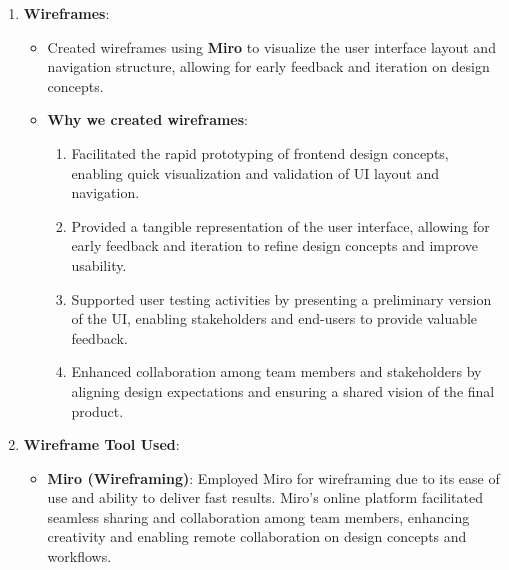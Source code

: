 \begin{enumerate}
    \item \textbf{Wireframes}:
    \begin{itemize}
        \item Created wireframes using \textbf{Miro} to visualize the user interface layout and navigation structure, allowing for early feedback and iteration on design concepts.
        \item \textbf{Why we created wireframes}:
            \begin{enumerate}
                \item Facilitated the rapid prototyping of frontend design concepts, enabling quick visualization and validation of UI layout and navigation.
                \item Provided a tangible representation of the user interface, allowing for early feedback and iteration to refine design concepts and improve usability.
                \item Supported user testing activities by presenting a preliminary version of the UI, enabling stakeholders and end-users to provide valuable feedback.
                \item Enhanced collaboration among team members and stakeholders by aligning design expectations and ensuring a shared vision of the final product.
            \end{enumerate}
    \end{itemize}
    
    \item \textbf{Wireframe Tool Used}:
        \begin{itemize}
            \item \textbf{Miro (Wireframing)}: Employed Miro for wireframing due to its ease of use and ability to deliver fast results. Miro's online platform facilitated seamless sharing and collaboration among team members, enhancing creativity and enabling remote collaboration on design concepts and workflows.
        \end{itemize}



\end{enumerate}

